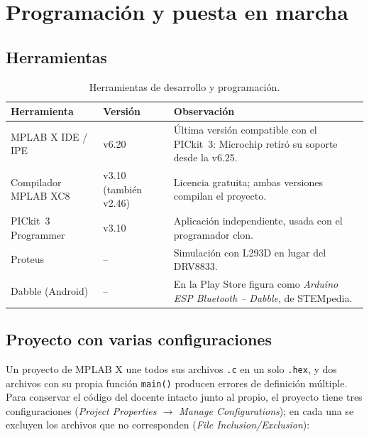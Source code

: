 \section{Programación y puesta en marcha}
\label{sec:programacion}

\subsection{Herramientas}

\begin{table}[H]
  \centering
  \caption{Herramientas de desarrollo y programación.}
  \label{tab:herramientas}
  \small
  \begin{tabularx}{\textwidth}{@{}l l L@{}}
    \toprule
    \textbf{Herramienta} & \textbf{Versión} & \textbf{Observación} \\
    \midrule
    MPLAB X IDE / IPE & v6.20 & Última versión compatible con el PICkit~3: Microchip retiró su soporte desde la v6.25. \\
    Compilador MPLAB XC8 & v3.10 (también v2.46) & Licencia gratuita; ambas versiones compilan el proyecto. \\
    PICkit~3 Programmer & v3.10 & Aplicación independiente, usada con el programador clon. \\
    Proteus & -- & Simulación con L293D en lugar del DRV8833. \\
    Dabble (Android) & -- & En la Play Store figura como \emph{Arduino ESP Bluetooth -- Dabble}, de STEMpedia. \\
    \bottomrule
  \end{tabularx}
\end{table}

\subsection{Proyecto con varias configuraciones}

Un proyecto de MPLAB X une todos sus archivos \texttt{.c} en un solo
\texttt{.hex}, y dos archivos con su propia función \texttt{main()} producen
errores de definición múltiple. Para conservar el código del docente intacto
junto al propio, el proyecto tiene tres configuraciones (\emph{Project
Properties $\rightarrow$ Manage Configurations}); en cada una se excluyen los
archivos que no corresponden (\emph{File Inclusion/Exclusion}):

